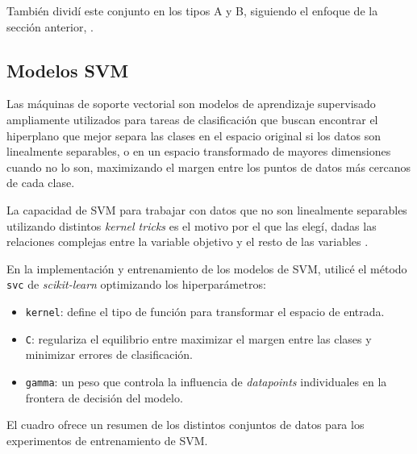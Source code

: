 \documentclass[10 pt]{article}
\begin{document}
También dividí este conjunto en los tipos A y B, siguiendo el enfoque de la sección anterior, . 

\subsection{Modelos SVM}\label{svm}

Las máquinas de soporte vectorial son modelos de aprendizaje supervisado ampliamente utilizados para tareas de clasificación que buscan encontrar el hiperplano que mejor separa las clases en el espacio original si los datos son linealmente separables, o en un espacio transformado de mayores dimensiones cuando no lo son, maximizando el margen entre los puntos de datos más cercanos de cada clase.  

La capacidad de SVM para trabajar con datos que no son linealmente separables utilizando distintos \textit{kernel tricks} es el motivo por el que las elegí, dadas las relaciones complejas entre la variable objetivo y el resto de las variables \citetext{\citealp[p. 323-331]{aid}}. 

En la implementación y entrenamiento de los modelos de SVM, utilicé el método \texttt{svc} de \textit{scikit-learn}\citetext{\citealp{scikit-learn}} optimizando los hiperparámetros:

\begin{itemize}
    \item \texttt{kernel}: define el tipo de función para transformar el espacio de entrada.
    \item \texttt{C}: regulariza el equilibrio entre maximizar el margen entre las clases y minimizar errores de clasificación.
    \item \texttt{gamma}: un peso que controla la influencia de \textit{datapoints} individuales en la frontera de decisión del modelo.
\end{itemize}



El cuadro  ofrece un resumen de los distintos conjuntos de datos para los experimentos de entrenamiento de SVM.
\end{document}
